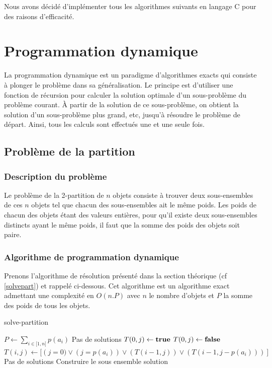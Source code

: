 

Nous avons décidé d'implémenter tous les algorithmes suivants en langage C pour des raisons d'efficacité.

\section{Programmation dynamique}
La programmation dynamique est un paradigme d'algorithmes exacts qui consiste à plonger le problème dans sa généralisation. Le principe est d'utiliser une fonction de récursion pour calculer la solution optimale d'un sous-problème du problème courant. À partir de la solution de ce sous-problème, on obtient la solution d'un sous-problème plus grand, etc, jusqu'à résoudre le problème de départ. Ainsi, tous les calculs sont effectués une et une seule fois.


\subsection{Problème de la partition}

\subsubsection{Description du problème}
Le problème de la 2-partition de $n$ objets consiste à trouver deux sous-ensembles de ces $n$ objets tel que chacun des sous-ensembles ait le même poids. Les poids de chacun des objets étant des valeurs entières, pour qu’il existe deux sous-ensembles distincts ayant le même poids, il faut que la somme des poids des objets soit paire.

\subsubsection{Algorithme de programmation dynamique}
Prenons l'algorithme de résolution présenté dans la section théorique (cf \ref{solvepart}) et rappelé ci-dessous. Cet algorithme est un algorithme exact admettant une complexité en $O(n.P)$ avec $n$ le nombre d'objets et $P$ la somme des poids de tous les objets.
\begin{algorithm}[H]
	\caption{solve-partition}
	\begin{algorithmic}[1]
		\STATE $P \leftarrow \sum_{i \in \mathbb{[}1, n \mathbb{]}} p(a_i)$
			\STATE Pas de solutions
		\ELSE
					\STATE $T(0, j) \leftarrow \textbf{true}{}$
				\ELSE
					\STATE $T(0, j) \leftarrow \textbf{false}{}$
				\ENDIF
			\ENDFOR
					\STATE $T(i, j) \leftarrow [\left (j = 0) \vee (j = p(a_i)) \vee (T(i-1, j)) \vee (T(i-1, j-p(a_i))) \right]$
				\ENDFOR
			\ENDFOR
				\STATE Pas de solutions
			\ELSE
				\STATE Construire le sous ensemble solution
			\ENDIF
		\ENDIF
	\end{algorithmic}
\end{algorithm}

